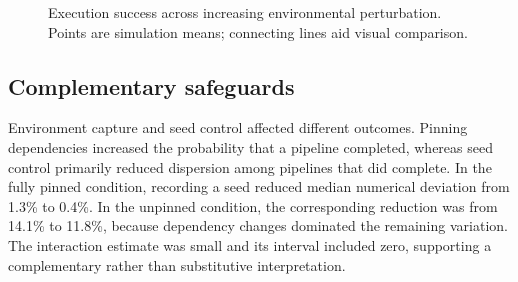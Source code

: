 \begin{figure}[tbp]
  \centering
  \caption{Execution success across increasing environmental perturbation.
  Points are simulation means; connecting lines aid visual comparison.}
  \label{fig:success}
\end{figure}

\subsection{Complementary safeguards}

Environment capture and seed control affected different outcomes. Pinning
dependencies increased the probability that a pipeline completed, whereas seed
control primarily reduced dispersion among pipelines that did complete. In the
fully pinned condition, recording a seed reduced median numerical deviation from
1.3\% to 0.4\%. In the unpinned condition, the corresponding reduction was from
14.1\% to 11.8\%, because dependency changes dominated the remaining variation.
The interaction estimate was small and its interval included zero, supporting a
complementary rather than substitutive interpretation.
